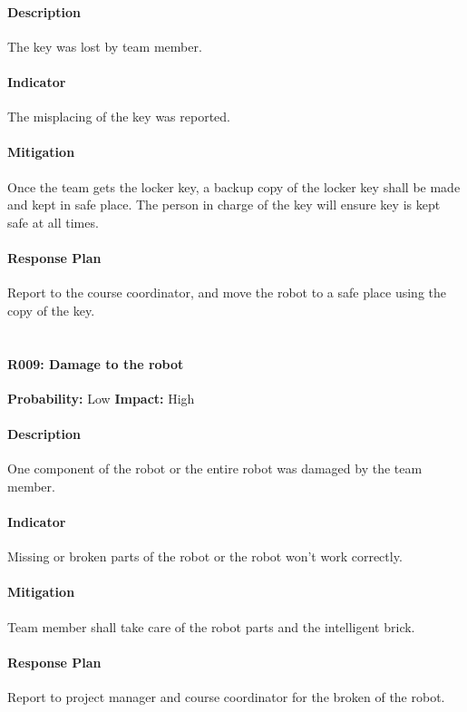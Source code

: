 \documentclass[11pt, a4paper]{report}
\begin{document}
	\paragraph{Description}The key was lost by team member. 
	\paragraph{Indicator}The misplacing of the key was reported.
	\paragraph{Mitigation}Once the team gets the locker key, a backup copy of the locker key shall be made and kept in safe place. The person in charge of the key will ensure key is kept safe at all times.
	\paragraph{Response Plan}Report to the course coordinator, and move the robot to a safe place using the copy of the key.\\\\

	\paragraph{R009: Damage to the robot} \hspace{1cm} \textbf{Probability: }Low\hspace{1cm}   \textbf{Impact: }High
	\paragraph{Description}One component of the robot or the entire robot was damaged by the team member.
	\paragraph{Indicator}Missing or broken parts of the robot or the robot won't work correctly.
	\paragraph{Mitigation}Team member shall take care of the robot parts and the intelligent brick.
	\paragraph{Response Plan}Report to project manager and course coordinator for the broken of the robot.\\\\
\end{document}
